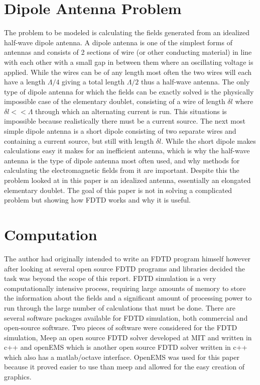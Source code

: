 \documentclass[twocolumn]{article}
\begin{document}
\section{Dipole Antenna Problem}

The problem to be modeled is calculating the fields generated from an idealized half-wave dipole
antenna. A dipole antenna is one of the simplest forms of antennas and consists of 2 sections of
wire (or other conducting material) in line with each other with a small gap in between them where
an oscillating voltage is applied. While the wires can be of any length most often the two wires
will each have a length $\Lambda/4$ giving a total length $\Lambda/2$ thus a half-wave antenna. The
only type of dipole antenna for which the fields can be exactly solved is the physically impossible
case of the elementary doublet, consisting of a wire of length $\delta{l}$ where
$\delta{l}<<\Lambda$ through which an alternating current is run. This situations is impossible
because realistically there must be a current source. The next most simple dipole antenna is a short
dipole consisting of two separate wires and containing a current source, but still with length
$\delta{l}$. While the short dipole makes calculations easy it makes for an inefficient antenna,
which is why the half-wave antenna is the type of dipole antenna most often used, and why methods
for calculating the electromagnetic fields from it are important. Despite this the problem looked at
in this paper is an idealized antenna, essentially an elongated elementary doublet. The goal of this
paper is not in solving a complicated problem but showing how FDTD works and why it is useful.

\section{Computation}
The author had originally intended to write an FDTD program himself however after looking at several
open source FDTD programs and libraries decided the task was beyond the scope of this report. FDTD
simulation is a very computationally intensive process, requiring large amounts of memory to store
the information about the fields and a significant amount of processing power to run through the
large number of calculations that must be done. There are several software packages available for
FDTD simulation, both commercial and open-source software. Two pieces of software were considered
for the FDTD simulation, Meep an open source FDTD solver developed at MIT and written in c++ and
openEMS which is another open source FDTD solver written in c++ which also has a matlab/octave
interface. OpenEMS was used for this paper because it proved easier to use than meep and allowed for
the easy creation of graphics.
\end{document}
